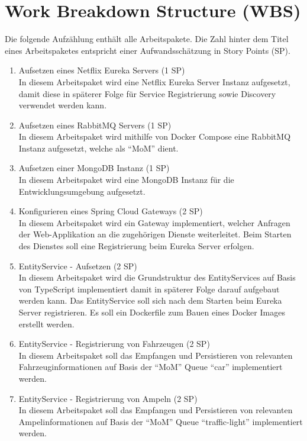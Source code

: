 \section{Work Breakdown Structure (WBS)}

Die folgende Aufzählung enthält alle Arbeitspakete.
Die Zahl hinter dem Titel eines Arbeitspaketes entspricht einer Aufwandsschätzung in Story Points (SP).

\begin{enumerate}
  \item Aufsetzen eines Netflix Eureka Servers (1 SP)\\
  		In diesem Arbeitspaket wird eine Netflix Eureka Server Instanz aufgesetzt, damit diese in späterer Folge für Service Registrierung sowie Discovery verwendet werden kann.
  \item Aufsetzen eines RabbitMQ Servers (1 SP)\\
  		In diesem Arbeitspaket wird mithilfe von Docker Compose eine RabbitMQ Instanz aufgesetzt, welche als \enquote{MoM} dient.
  \item Aufsetzen einer MongoDB Instanz (1 SP)\\
  		In diesem Arbeitspaket wird eine MongoDB Instanz für die Entwicklungsumgebung aufgesetzt.
  \item Konfigurieren eines Spring Cloud Gateways (2 SP)\\
  		In diesem Arbeitspaket wird ein Gateway implementiert, welcher Anfragen der Web-Applikation an die zugehörigen Dienste weiterleitet.
  		Beim Starten des Dienstes soll eine Registrierung beim Eureka Server erfolgen.
  \item EntityService - Aufsetzen (2 SP)\\
  		In diesem Arbeitspaket wird die Grundstruktur des EntityServices auf Basis von TypeScript implementiert damit in späterer Folge darauf aufgebaut werden kann.
  		Das EntityService soll sich nach dem Starten beim Eureka Server registrieren.
  		Es soll ein Dockerfile zum Bauen eines Docker Images erstellt werden.
  \item EntityService - Registrierung von Fahrzeugen (2 SP)\\
  		In diesem Arbeitspaket soll das Empfangen und Persistieren von relevanten Fahrzeuginformationen auf Basis der \enquote{MoM} Queue \enquote{car} implementiert werden.
  \item EntityService - Registrierung von Ampeln (2 SP)\\
  		In diesem Arbeitspaket soll das Empfangen und Persistieren von relevanten Ampelinformationen auf Basis der \enquote{MoM} Queue \enquote{traffic-light} implementiert werden.

\end{enumerate}
